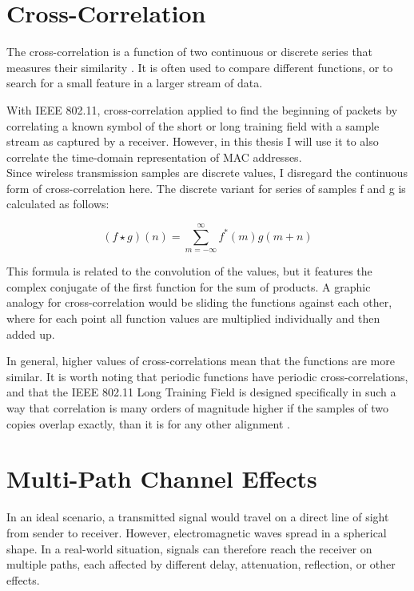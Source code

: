 
\section{Cross-Correlation}

The cross-correlation is a function of two continuous or discrete series that measures their similarity \cite{rabiner1978}. It is often used to compare different functions, or to search for a small feature in a larger stream of data.

With IEEE 802.11, cross-correlation applied to find the beginning of packets by correlating a known symbol of the short or long training field with a sample stream as captured by a receiver. However, in this thesis I will use it to also correlate the time-domain representation of MAC addresses.\\

Since wireless transmission samples are discrete values, I disregard the continuous form of cross-correlation here. The discrete variant for series of samples f and g is calculated as follows:

$$ (f \star g)(n) = \sum_{m=-\infty}^{\infty} f^{\ast}(m) g(m+n) $$\vspace{0cm}

This formula is related to the convolution of the values, but it features the complex conjugate of the first function for the sum of products. A graphic analogy for cross-correlation would be sliding the functions against each other, where for each point all function values are multiplied individually and then added up.

In general, higher values of cross-correlations mean that the functions are more similar. It is worth noting that periodic functions have periodic cross-correlations, and that the IEEE 802.11 Long Training Field is designed specifically in such a way that correlation is many orders of magnitude higher if the samples of two copies overlap exactly, than it is for any other alignment \cite{perahia2013}.



\section{Multi-Path Channel Effects}\label{sec:multipath}

In an ideal scenario, a transmitted signal would travel on a direct line of sight from sender to receiver. However, electromagnetic waves spread in a spherical shape. In a real-world situation, signals can therefore reach the receiver on multiple paths, each affected by different delay, attenuation, reflection, or other effects.

